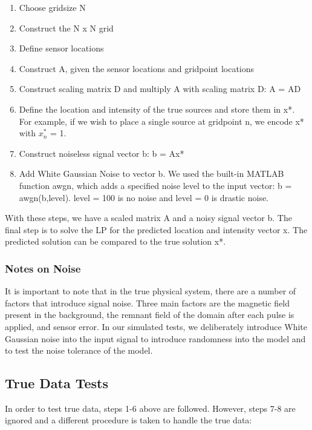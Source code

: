 \documentclass[a4paper]{article}
\begin{document}
\begin{enumerate}
\item Choose gridsize N
\item Construct the N x N grid
\item Define sensor locations
\item Construct A, given the sensor locations and gridpoint locations
\item Construct scaling matrix D and multiply A with scaling matrix D: A = AD
\item Define the location and intensity of the true sources and store them in x*. For example, if we wish to place a single source at gridpoint n, we encode x* with $x_n^{*}$ = 1.
\item Construct noiseless signal vector b: b = Ax*
\item Add White Gaussian Noise to vector b. We used the built-in MATLAB function awgn, which adds a specified noise level to the input vector: b = awgn(b,level). level = 100 is no noise and level = 0 is drastic noise.

\end{enumerate}

With these steps, we have a scaled matrix A and a noisy signal vector b. The final step is to solve the LP for the predicted location and intensity vector x. The predicted solution can be compared to the true solution x*.

\subsubsection*{Notes on Noise}
It is important to note that in the true physical system, there are a number of factors that introduce signal noise. Three main factors are the magnetic field present in the background, the remnant field of the domain after each pulse is applied, and sensor error. In our simulated tests, we deliberately introduce White Gaussian noise into the input signal to introduce randomness into the model and to test the noise tolerance of the model.

\subsection{True Data Tests}
In order to test true data, steps 1-6 above are followed. However, steps 7-8 are ignored and a different procedure is taken to handle the true data:
\end{document}

